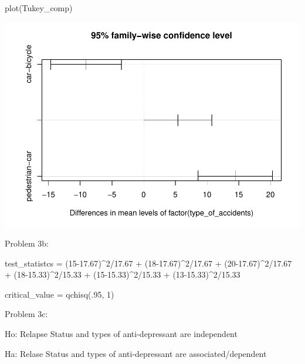 \documentclass[
]{article}
\newenvironment{Shaded}{\begin{snugshade}}{\end{snugshade}}
\newcommand{\DecValTok}[1]{\textcolor[rgb]{0.00,0.00,0.81}{#1}}
\newcommand{\FloatTok}[1]{\textcolor[rgb]{0.00,0.00,0.81}{#1}}
\newcommand{\FunctionTok}[1]{\textcolor[rgb]{0.00,0.00,0.00}{#1}}
\newcommand{\NormalTok}[1]{#1}
\newcommand{\OtherTok}[1]{\textcolor[rgb]{0.56,0.35,0.01}{#1}}
\newcommand{\SpecialCharTok}[1]{\textcolor[rgb]{0.00,0.00,0.00}{#1}}
\begin{document}
\begin{Shaded}
\begin{Highlighting}[]
\FunctionTok{plot}\NormalTok{(Tukey\_comp)}
\end{Highlighting}
\end{Shaded}

\includegraphics{HW4-tk2886-_files/figure-latex/unnamed-chunk-7-1.pdf}

Problem 3b:

\begin{Shaded}
\begin{Highlighting}[]
\NormalTok{test\_statistcs }\OtherTok{=}\NormalTok{ (}\DecValTok{15}\FloatTok{{-}17.67}\NormalTok{)}\SpecialCharTok{\^{}}\DecValTok{2}\SpecialCharTok{/}\FloatTok{17.67} \SpecialCharTok{+}\NormalTok{ (}\DecValTok{18}\FloatTok{{-}17.67}\NormalTok{)}\SpecialCharTok{\^{}}\DecValTok{2}\SpecialCharTok{/}\FloatTok{17.67} \SpecialCharTok{+}\NormalTok{ (}\DecValTok{20}\FloatTok{{-}17.67}\NormalTok{)}\SpecialCharTok{\^{}}\DecValTok{2}\SpecialCharTok{/}\FloatTok{17.67} \SpecialCharTok{+}\NormalTok{ (}\DecValTok{18}\FloatTok{{-}15.33}\NormalTok{)}\SpecialCharTok{\^{}}\DecValTok{2}\SpecialCharTok{/}\FloatTok{15.33} \SpecialCharTok{+}\NormalTok{ (}\DecValTok{15}\FloatTok{{-}15.33}\NormalTok{)}\SpecialCharTok{\^{}}\DecValTok{2}\SpecialCharTok{/}\FloatTok{15.33} \SpecialCharTok{+}\NormalTok{ (}\DecValTok{13}\FloatTok{{-}15.33}\NormalTok{)}\SpecialCharTok{\^{}}\DecValTok{2}\SpecialCharTok{/}\FloatTok{15.33}
\end{Highlighting}
\end{Shaded}

\begin{Shaded}
\begin{Highlighting}[]
\NormalTok{critical\_value }\OtherTok{=} \FunctionTok{qchisq}\NormalTok{(.}\DecValTok{95}\NormalTok{, }\DecValTok{1}\NormalTok{)}
\end{Highlighting}
\end{Shaded}

Problem 3c:

Ho: Relapse Status and types of anti-depressant are independent

Ha: Relase Status and types of anti-depressant are associated/dependent
\end{document}
